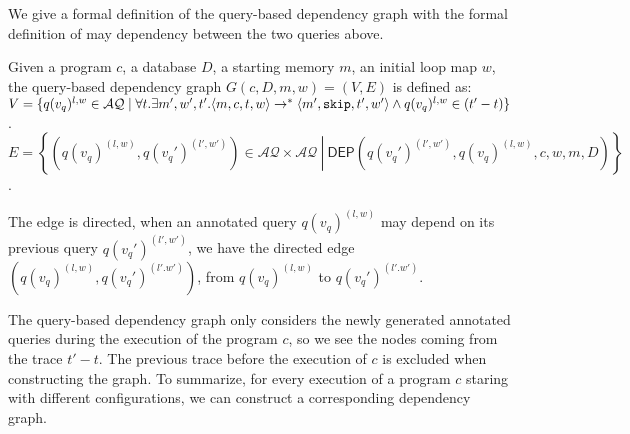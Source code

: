 %
We give a formal definition of the query-based dependency graph with the formal definition of may dependency between the two queries above.  
\begin{defn}
Given a program $c$, a database $D$, a starting memory $m$, an initial loop map $w$, the query-based dependency graph $G(c,D,m,w) = (V, E)$ is defined as: \\
$V =\{q({v_q})^{l,w} \in \mathcal{AQ} \mid \forall t. \exists m',  w', t'.  \langle m ,c, t, w \rangle  \to^{*}  \langle m' , \mathtt{skip}, t', w'  \rangle  \land q({v_q})^{l,w} \in {(t'-t)}  \}$.
\\
$E = \left\{(q({v_q})^{(l,w)},q({v_q}')^{(l',w')}) \in \mathcal{AQ} \times \mathcal{AQ} 
~ \left \vert ~ \mathsf{DEP}(q({v_q}')^{(l',w')},q({v_q})^{(l,w)}, c,w,m,D)
 \right.\right\}$.
\end{defn}
%
The edge is directed, when an annotated query $q({v_q})^{(l,w)}$ may depend on its previous query $q({v_q}')^{(l',w')}$, we have the directed
edge $(q({v_q})^{(l,w)}, q({v_q}')^{(l'.w')})$, from $q({v_q})^{(l,w)} $ to $q({v_q}')^{(l'.w')}$.

The query-based dependency graph only considers the newly generated annotated queries during the execution of the program $c$, so we see the nodes coming from the trace $t'-t$. The previous trace before the execution of $c$ is excluded when constructing the graph. To summarize, for every execution of a program $c$ staring with different configurations, we can construct a corresponding dependency graph. 

